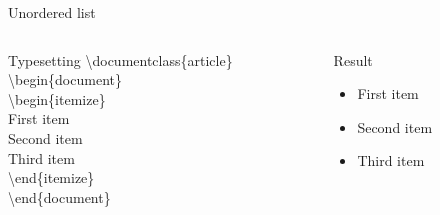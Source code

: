 \documentclass[10pt,xcolor={dvipsnames}]{beamer}
\begin{document}
		\begin{frame}{Unordered list}
			\begin{columns}[T]
				
				\begin{column}{.5 \textwidth}
					\onslide<2->
					\begin{block}{Typesetting}
						\textbackslash documentclass\{{\color{blue}article}\}\\
						
						\textbackslash begin\{{\color{blue}document}\}\\
						
							\quad\textbackslash begin\{{\color{orange}itemize}\}\\
								 First item\\
								 Second item\\
								 Third item\\
							\quad\textbackslash end\{{\color{orange}itemize}\}\\
						
						\textbackslash end\{{\color{blue}document}\}
					\end{block}
				\end{column}
				
				\begin{column}{.5 \textwidth}
					\onslide<3->
					\begin{block}{Result}
						\begin{itemize}
							\item First item
							\item Second item
							\item Third item
						\end{itemize}
					\end{block}
				\end{column}
				
			\end{columns}
		\end{frame}
	
\end{document}
